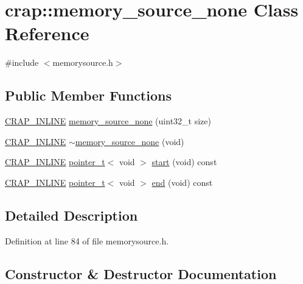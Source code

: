 \hypertarget{classcrap_1_1memory__source__none}{}\section{crap\+:\+:memory\+\_\+source\+\_\+none Class Reference}
\label{classcrap_1_1memory__source__none}


{\ttfamily \#include $<$memorysource.\+h$>$}

\subsection*{Public Member Functions}
\begin{DoxyCompactItemize}
\item 
\hyperlink{config__x86_8h_a5a40526b8d842e7ff731509998bb0f1c}{C\+R\+A\+P\+\_\+\+I\+N\+L\+I\+N\+E} \hyperlink{classcrap_1_1memory__source__none_a119d02b5c04855dd3e54a97c3d477020}{memory\+\_\+source\+\_\+none} (uint32\+\_\+t size)
\item 
\hyperlink{config__x86_8h_a5a40526b8d842e7ff731509998bb0f1c}{C\+R\+A\+P\+\_\+\+I\+N\+L\+I\+N\+E} \hyperlink{classcrap_1_1memory__source__none_aca705d4bf8ac1bc924448c925f56bf90}{$\sim$memory\+\_\+source\+\_\+none} (void)
\item 
\hyperlink{config__x86_8h_a5a40526b8d842e7ff731509998bb0f1c}{C\+R\+A\+P\+\_\+\+I\+N\+L\+I\+N\+E} \hyperlink{structcrap_1_1pointer__t}{pointer\+\_\+t}$<$ void $>$ \hyperlink{classcrap_1_1memory__source__none_afb16be2e0f1381e08f4be56753b4625a}{start} (void) const 
\item 
\hyperlink{config__x86_8h_a5a40526b8d842e7ff731509998bb0f1c}{C\+R\+A\+P\+\_\+\+I\+N\+L\+I\+N\+E} \hyperlink{structcrap_1_1pointer__t}{pointer\+\_\+t}$<$ void $>$ \hyperlink{classcrap_1_1memory__source__none_a210a46d12d0e6d111c7e341f66e66299}{end} (void) const 
\end{DoxyCompactItemize}


\subsection{Detailed Description}


Definition at line 84 of file memorysource.\+h.



\subsection{Constructor \& Destructor Documentation}
\hypertarget{classcrap_1_1memory__source__none_a119d02b5c04855dd3e54a97c3d477020}{}
